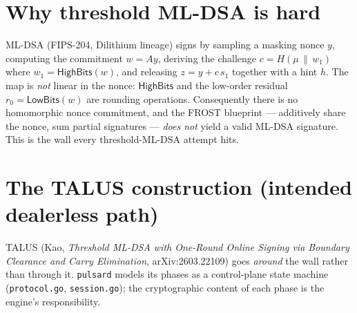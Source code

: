 \documentclass[11pt]{article}
\newcommand{\HighBits}{\mathsf{HighBits}}
\newcommand{\LowBits}{\mathsf{LowBits}}
\theoremstyle{definition}
\theoremstyle{plain}
\begin{document}
\section{Why threshold ML-DSA is hard}

ML-DSA (FIPS-204, Dilithium lineage) signs by sampling a masking nonce
\(y\), computing the commitment \(w = A y\), deriving the challenge
\(c = H(\mu \,\|\, w_1)\) where \(w_1 = \HighBits(w)\), and releasing
\(z = y + c\,s_1\) together with a hint \(h\). The map is \emph{not} linear in
the nonce: \(\HighBits\) and the low-order residual \(r_0=\LowBits(w)\) are
rounding operations. Consequently there is no homomorphic nonce commitment, and
the FROST blueprint --- additively share the nonce, sum partial signatures ---
\emph{does not} yield a valid ML-DSA signature. This is the wall every
threshold-ML-DSA attempt hits.

\section{The TALUS construction (intended dealerless path)}
\label{sec:talus}

TALUS (Kao, \emph{Threshold ML-DSA with One-Round Online Signing via Boundary
Clearance and Carry Elimination}, arXiv:2603.22109) goes \emph{around} the wall
rather than through it. \texttt{pulsard} models its phases as a control-plane
state machine (\texttt{protocol.go}, \texttt{session.go}); the cryptographic
content of each phase is the engine's responsibility.
\end{document}
